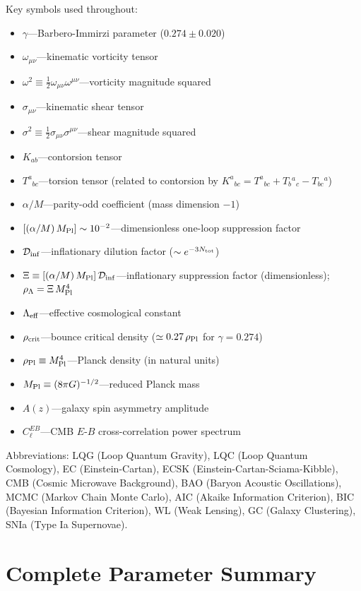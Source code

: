\documentclass[aps,prd,twocolumn,superscriptaddress,showpacs,preprintnumbers,nofootinbib,longbibliography,floatfix]{revtex4-2}
\newcommand{\Leff}{\Lambda_{\rm eff}}
\newcommand{\Dinf}{\mathcal{D}_{\rm inf}}
\newcommand{\rhocrit}{\rho_{\rm crit}}
\newcommand{\rhoPl}{\rho_{\rm Pl}}
\newcommand{\MPl}{M_{\rm Pl}}
\begin{document}
Key symbols used throughout:
\begin{itemize}[leftmargin=*]
\item $\gamma$---Barbero-Immirzi parameter ($0.274 \pm 0.020$)
\item $\omega_{\mu\nu}$---kinematic vorticity tensor
\item $\omega^2 \equiv \frac{1}{2}\omega_{\mu\nu}\omega^{\mu\nu}$---vorticity magnitude squared
\item $\sigma_{\mu\nu}$---kinematic shear tensor
\item $\sigma^2 \equiv \frac{1}{2}\sigma_{\mu\nu}\sigma^{\mu\nu}$---shear magnitude squared
\item $K_{ab}$---contorsion tensor
\item $T^a_{\;\;bc}$---torsion tensor (related to contorsion by $K^{a}{}_{bc} = T^{a}{}_{bc} + T_{b}{}^{a}{}_{c} - T_{bc}{}^{a}$)
\item $\alpha/M$---parity-odd coefficient (mass dimension $-1$)
\item $[(\alpha/M)\,\MPl]\sim 10^{-2}$---dimensionless one-loop suppression factor
\item $\Dinf$---inflationary dilution factor ($\sim e^{-3N_{\rm tot}}$)
\item $\Xi\equiv[(\alpha/M)\,\MPl]\,\Dinf$---inflationary suppression factor (dimensionless); $\rho_\Lambda = \Xi\,\MPl^4$
\item $\Leff$---effective cosmological constant
\item $\rhocrit$---bounce critical density ($\simeq 0.27\,\rhoPl$ for $\gamma=0.274$)
\item $\rhoPl \equiv M_{\rm Pl}^4$---Planck density (in natural units)
\item $\MPl \equiv (8\pi G)^{-1/2}$---reduced Planck mass
\item $A(z)$---galaxy spin asymmetry amplitude
\item $C_\ell^{EB}$---CMB $E$-$B$ cross-correlation power spectrum
\end{itemize}

Abbreviations: LQG (Loop Quantum Gravity), LQC (Loop Quantum Cosmology), EC (Einstein-Cartan), ECSK (Einstein-Cartan-Sciama-Kibble), CMB (Cosmic Microwave Background), BAO (Baryon Acoustic Oscillations), MCMC (Markov Chain Monte Carlo), AIC (Akaike Information Criterion), BIC (Bayesian Information Criterion), WL (Weak Lensing), GC (Galaxy Clustering), SNIa (Type Ia Supernovae).


\section{Complete Parameter Summary}\label{app:params}
\end{document}
